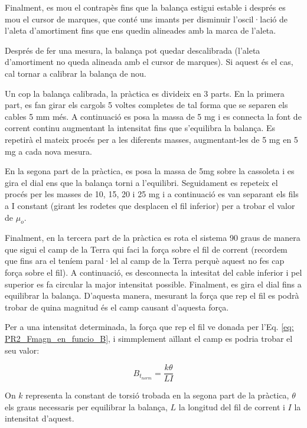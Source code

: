 \documentclass[11pt]{article}
\numberwithin{equation}{section}
\numberwithin{figure}{section}
\numberwithin{table}{section}
\begin{document}
Finalment, es mou el contrapès fins que la balança estigui estable i després es mou el cursor de marques, que conté uns imants per disminuir l'oscil·lació de l'aleta d'amortiment fins que ens quedin alineades amb la marca de l'aleta.

Després de fer una mesura, la balança pot quedar descalibrada (l'aleta d'amortiment no queda alineada amb el cursor de marques). Si aquest és el cas, cal tornar a calibrar la balança de nou.

Un cop la balança calibrada, la pràctica es divideix en 3 parts. En la primera part, es fan girar els cargols 5 voltes completes de tal forma que se separen els cables 5 mm més. A continuació es posa la massa de 5 mg i es connecta la font de corrent continu augmentant la intensitat fins que
s'equilibra la balança. Es repetirà el mateix procés per a les diferents masses, augmentant-les de 5 mg en 5 mg a cada nova mesura.

En la segona part de la pràctica, es posa la massa de 5mg sobre la cassoleta i es gira el dial ens que la balança torni a l'equilibri. Seguidament es repeteix el procés per les masses de 10, 15, 20 i 25 mg i a continuació es van separant els fils a I constant (girant les rodetes que desplacen el fil inferior) per a trobar el valor de $\mu_o$.

Finalment, en la tercera part de la pràctica es rota el sistema 90 graus de manera que sigui el camp de la Terra qui faci la força sobre el fil de corrent (recordem que fins ara el teníem paral·lel al camp de la Terra perquè aquest no fes cap força sobre el fil). A continuació, es desconnecta la intesitat del cable inferior i pel superior es fa circular la major intensitat possible. Finalment, es gira el dial fins a equilibrar la balança. D’aquesta manera, mesurant la força que rep el fil es podrà trobar de quina magnitud és el camp causant d’aquesta força.

Per a una intensitat determinada, la força que rep el fil ve donada per l’Eq. \eqref{eq: PR2_Fmagn_en_funcio_B}, i simmplement aïllant el camp es podria trobar el seu valor:

\begin{equation}\label{eq: PR2_Btnorm}
    B_{t_{norm}} = \frac{k\theta}{LI}
\end{equation}

On $k$ representa la constant de torsió trobada en la segona part de la pràctica, $\theta$ els graus necessaris per equilibrar la balança, $L$ la longitud del fil de corrent i $I$ la intensitat d'aquest.
\end{document}
